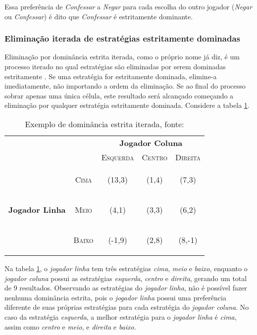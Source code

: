 Essa preferência de \emph{Confessar} a \emph{Negar} para cada escolha do outro jogador (\emph{Negar} ou \emph{Confessar}) é dito que \emph{Confessar} é estritamente dominante.

\subsubsection{Eliminação iterada de estratégias estritamente dominadas}

Eliminação por dominância estrita iterada, como o próprio nome já diz, é um processo iterado no qual estratégias são eliminadas por serem dominadas estritamente \cite{spaniel_2011}. Se uma estratégia for estritamente dominada, elimine-a imediatamente, não importando a ordem da eliminação. Se ao final do processo sobrar apenas uma única célula, este resultado será alcançado começando a eliminação por qualquer estratégia estritamente dominada. Considere a tabela \ref{tab:dominancia-estrita-iterada}.

\begin{table}[ht]
\centering
\begin{tabular}{|c|c|c|c|c|}
\cline{3-5}
\multicolumn{1}{c}{} &  & \multicolumn{3}{c|}{\textbf{Jogador Coluna}}\tabularnewline
\cline{3-5}
\multicolumn{1}{c}{} &  & \textsc{Esquerda} & \textsc{Centro} & \textsc{Direita}\tabularnewline
\hline
\multirow{3}{*}{\begin{turn}{90}
\textbf{Jogador Linha}
\end{turn}} & \begin{turn}{90}
\textsc{Cima}
\end{turn} & {\Large(13,3)} & {\Large(1,4)} & {\Large(7,3)} \tabularnewline
\cline{2-5}
 & \begin{turn}{90}
\textsc{Meio}
\end{turn} & {\Large(4,1)} & {\Large(3,3)} & {\Large(6,2)} \tabularnewline
\cline{2-5}
 & \begin{turn}{90}
\textsc{Baixo}
\end{turn} &  {\Large(-1,9)} & {\Large(2,8)} & {\Large(8,-1)} \tabularnewline
\hline
\end{tabular}
\caption{Exemplo de dominância estrita iterada, fonte: \cite{spaniel_2011}}
\label{tab:dominancia-estrita-iterada}
\end{table}

Na tabela \ref{tab:dominancia-estrita-iterada}, o \emph{jogador linha} tem três estratégias \emph{cima}, \emph{meio} e \emph{baixo}, enquanto o \emph{jogador coluna} possui as estratégias \emph{esquerda}, \emph{centro} e \emph{direita}, gerando um total de 9 resultados.
Observando as estratégias do \emph{jogador linha}, não é possível fazer nenhuma dominância estrita, pois o \emph{jogador linha} possui uma preferência diferente de suas próprias estratégias para cada estratégia do \emph{jogador coluna}. No caso da estratégia \emph{esquerda}, a melhor estratégia para o \emph{jogador linha} é \emph{cima}, assim como \emph{centro} e \emph{meio}, e \emph{direita} e \emph{baixo}.

